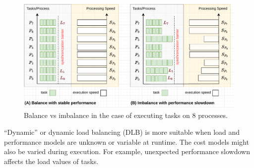 \begin{figure}[t]
	\centering
	\includegraphics[scale=0.7]{./pictures/preliminaries/preli_balance_vs_imbalance_by_perfslow.pdf}
	\caption{Balance vs imbalance in the case of executing tasks on 8 processes.}
	\label{fig:preli_balance_vs_imbalance_by_perfslow}
\end{figure}


``Dynamic'' or dynamic load balancing (DLB) is more suitable when load and performance models are unknown or variable at runtime. The cost models might also be varied during execution. For example, unexpected performance slowdown affects the load values of tasks. \\

